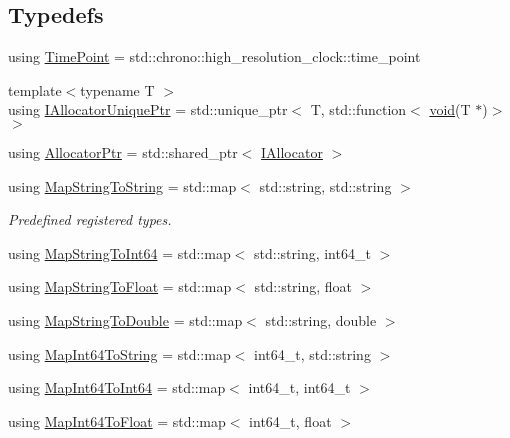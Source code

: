 \subsection*{Typedefs}
\begin{DoxyCompactItemize}
\item 
using \mbox{\hyperlink{namespaceonnxruntime_a9b5a17a572f7c3cf77f4892542bd7153}{Time\+Point}} = std\+::chrono\+::high\+\_\+resolution\+\_\+clock\+::time\+\_\+point
\item 
{\footnotesize template$<$typename T $>$ }\\using \mbox{\hyperlink{namespaceonnxruntime_a323aace024f171700e4b07b299a178e7}{I\+Allocator\+Unique\+Ptr}} = std\+::unique\+\_\+ptr$<$ T, std\+::function$<$ \mbox{\hyperlink{mlasi_8h_a88f941d423cb2a819b70a1358982b1a6}{void}}(T $\ast$)$>$ $>$
\item 
using \mbox{\hyperlink{namespaceonnxruntime_a6cdac724c5dcefded3a63f08dae58fda}{Allocator\+Ptr}} = std\+::shared\+\_\+ptr$<$ \mbox{\hyperlink{classonnxruntime_1_1IAllocator}{I\+Allocator}} $>$
\item 
using \mbox{\hyperlink{namespaceonnxruntime_ad08e9cd3839f6134e87cee3370f5d7b3}{Map\+String\+To\+String}} = std\+::map$<$ std\+::string, std\+::string $>$
\begin{DoxyCompactList}\small\item\em Predefined registered types. \end{DoxyCompactList}\item 
using \mbox{\hyperlink{namespaceonnxruntime_a8333bda111400cb767f9faa6f862f560}{Map\+String\+To\+Int64}} = std\+::map$<$ std\+::string, int64\+\_\+t $>$
\item 
using \mbox{\hyperlink{namespaceonnxruntime_af68ce46a8b6ce3aecf826a569e1e9b62}{Map\+String\+To\+Float}} = std\+::map$<$ std\+::string, float $>$
\item 
using \mbox{\hyperlink{namespaceonnxruntime_a7d1b777d3fc91cfb2ac4e9649064d7fb}{Map\+String\+To\+Double}} = std\+::map$<$ std\+::string, double $>$
\item 
using \mbox{\hyperlink{namespaceonnxruntime_aacdd746e76cac47aeec1ee5fa1d01956}{Map\+Int64\+To\+String}} = std\+::map$<$ int64\+\_\+t, std\+::string $>$
\item 
using \mbox{\hyperlink{namespaceonnxruntime_a3dab3548e5750ae69a56e308a4031ad0}{Map\+Int64\+To\+Int64}} = std\+::map$<$ int64\+\_\+t, int64\+\_\+t $>$
\item 
using \mbox{\hyperlink{namespaceonnxruntime_ab3c488c9d67df3d8a91c90f9bb360e93}{Map\+Int64\+To\+Float}} = std\+::map$<$ int64\+\_\+t, float $>$

\end{DoxyCompactItemize}

